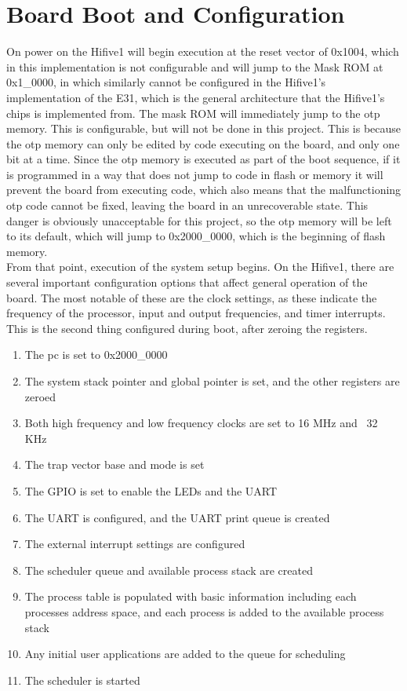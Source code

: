 \section{Board Boot and Configuration}
On power on the Hifive1 will begin execution at the reset vector of 0x1004, which in this implementation is not configurable and will jump to the Mask ROM at 0x1\_0000, in which similarly cannot be configured in the Hifive1's implementation of the E31, which is the general architecture that the Hifive1's chips is implemented from. The mask ROM will immediately jump to the \ac{otp} memory. This is configurable, but will not be done in this project. This is because the \ac{otp} memory can only be edited by code executing on the board, and only one bit at a time. Since the \ac{otp} memory is executed as part of the boot sequence, if it is programmed in a way that does not jump to code in flash or memory it will prevent the board from executing code, which also means that the malfunctioning \ac{otp} code cannot be fixed, leaving the board in an unrecoverable state. This danger is obviously unacceptable for this project, so the \ac{otp} memory will be left to its default, which will jump to 0x2000\_0000, which is the beginning of flash memory.\\
From that point, execution of the system setup begins.
On the Hifive1, there are several important configuration options that affect general operation of the board. The most notable of these are the clock settings, as these indicate the frequency of the processor, input and output frequencies, and timer interrupts. This is the second thing configured during boot, after zeroing the registers.
\begin{enumerate}
    \item The pc is set to 0x2000\_0000
    \item The system stack pointer and global pointer is set, and the other registers are zeroed
    \item Both high frequency and low frequency clocks are set to 16 MHz and ~32 KHz
    \item The trap vector base and mode is set
    \item The GPIO is set to enable the LEDs and the UART
    \item The UART is configured, and the UART print queue is created
    \item The external interrupt settings are configured
    \item The scheduler queue and available process stack are created
    \item The process table is populated with basic information including each processes address space, and each process is added to the available process stack
    \item Any initial user applications are added to the queue for scheduling
    \item The scheduler is started
\end{enumerate}

